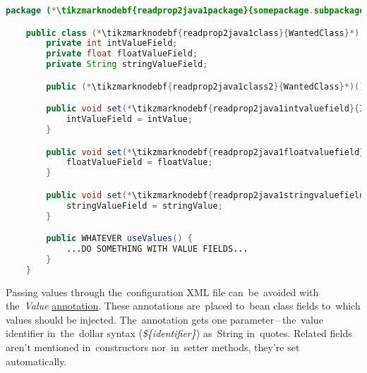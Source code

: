\begin{lstlisting}[language=Java, title={Wanted class with the zero--parameter constructor and setter methods}]
    package (*\tikzmarknodebf{readprop2java1package}{somepackage.subpackage}*);

    public class (*\tikzmarknodebf{readprop2java1class}{WantedClass}*) implements WantedInterface {
        private int intValueField;
        private float floatValueField;
        private String stringValueField;

        public (*\tikzmarknodebf{readprop2java1class2}{WantedClass}*)() {}

        public void set(*\tikzmarknodebf{readprop2java1intvaluefield}{IntValueField}*)(int intValue) {
            intValueField = intValue;
        }

        public void set(*\tikzmarknodebf{readprop2java1floatvaluefield}{FloatValueField}*)(float floatValue) {
            floatValueField = floatValue;
        }

        public void set(*\tikzmarknodebf{readprop2java1stringvaluefield}{StringValueField}*)(string stringValue) {
            stringValueField = stringValue;
        }

        public WHATEVER useValues() {
            ...DO SOMETHING WITH VALUE FIELDS...
        }
    }
\end{lstlisting}
\newpage

\label{readingpropertiesannotations}
Passing values through the~configuration XML file can~be~avoided with the~\textit{Value} \hyperref[javaannotation]{annotation}. These annotations are~placed to~bean class fields to~which values should be injected. The~annotation gets one parameter\,--\,the~value identifier in~the~dollar syntax (\textit{\$\{identifier\}}) as~String in~quotes. Related fields aren't mentioned in~constructors nor~in~setter methods, they're set automatically.

